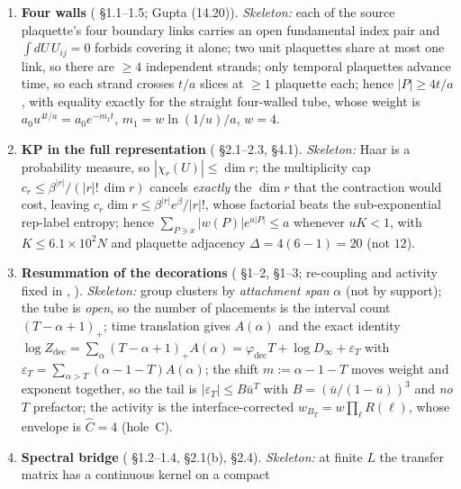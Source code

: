 \begin{enumerate}[label=\textbf{R\arabic*.},leftmargin=2.6em]
\item \textbf{Four walls} ( \S1.1--1.5; Gupta (14.20)).
      \emph{Skeleton:} each of the source plaquette's four boundary links carries an open
      fundamental index pair and $\int dU\,U_{ij}=0$ forbids covering it alone; two unit
      plaquettes share at most one link, so there are $\ge4$ independent strands; only temporal
      plaquettes advance time, so each strand crosses $t/a$ slices at $\ge1$ plaquette each;
      hence $|P|\ge4t/a$, with equality exactly for the straight four-walled tube, whose weight
      is $a_0u^{4t/a}=a_0e^{-m_1t}$, $m_1=w\ln(1/u)/a$, $w=4$. \LT{}
\item \textbf{KP in the full representation} ( \S2.1--2.3, \S4.1).
      \emph{Skeleton:} Haar is a probability measure, so $|\chi_r(U)|\le\dim r$; the multiplicity
      cap $c_r\le\beta^{|r|}/(|r|!\,\dim r)$ cancels \emph{exactly} the $\dim r$ that the
      contraction would cost, leaving $c_r\dim r\le\beta^{|r|}e^{\beta}/|r|!$, whose factorial
      beats the sub-exponential rep-label entropy; hence
      $\sum_{P\ni x}|w(P)|e^{a|P|}\le a$ whenever $uK<1$, with $K\le6.1\times10^{2}N$ and
      plaquette adjacency $\Delta=4(6-1)=20$ (not $12$). \LT{}
\item \textbf{Resummation of the decorations} ( \S1--2,
       \S1--3; re-coupling and activity fixed in
      , ). \emph{Skeleton:} group clusters by
      \emph{attachment span} $\alpha$ (not by support); the tube is \emph{open}, so the number of
      placements is the interval count $(T-\alpha+1)_+$; time translation gives $A(\alpha)$ and
      the exact identity
      $\log Z_{\mathrm{dec}}=\sum_\alpha(T-\alpha+1)_+A(\alpha)
      =\varphi_{\mathrm{dec}}T+\log D_\infty+\varepsilon_T$ with
      $\varepsilon_T=\sum_{\alpha>T}(\alpha-1-T)A(\alpha)$; the shift
      $m:=\alpha-1-T$ moves weight and exponent together, so the tail is
      $|\varepsilon_T|\le B\bar u^{T}$ with $B=(\bar u/(1-\bar u))^{3}$ and \emph{no} $T$
      prefactor; the activity is the interface-corrected $w_{B_T}=w\prod_{\ell}R(\ell)$, whose
      envelope is $\hat C=4$ (hole~C). \LT{}
\item \textbf{Spectral bridge} ( \S1.2--1.4, \S2.1(b), \S2.4).
      \emph{Skeleton:} at finite $L$ the transfer matrix has a continuous kernel on a compact

\end{enumerate}
